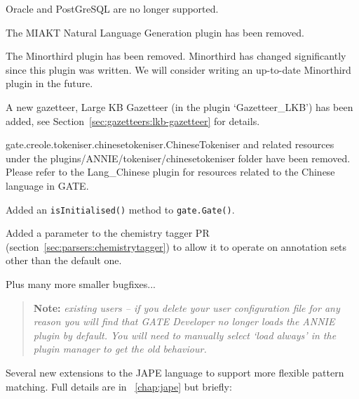Oracle and PostGreSQL are no longer supported.

The MIAKT Natural Language Generation plugin has been removed.

The Minorthird plugin has been removed. Minorthird has changed significantly
since this plugin was written. We will consider writing an up-to-date
Minorthird plugin in the future.

A new gazetteer, Large KB Gazetteer (in the plugin `Gazetteer\_LKB') has been
added, see Section~\ref{sec:gazetteers:lkb-gazetteer} for details.

gate.creole.tokeniser.chinesetokeniser.ChineseTokeniser and related resources 
under the plugins/ANNIE/tokeniser/chinesetokeniser folder have been removed.
Please refer to the Lang\_Chinese plugin for resources related to the Chinese 
language in GATE.

Added an {\tt isInitialised()} method to {\tt gate.Gate()}.

Added a parameter to the chemistry tagger PR
(section~\ref{sec:parsers:chemistrytagger}) to allow it to operate on
annotation sets other than the default one.

Plus many more smaller bugfixes...


\label{sec:changes:5.0b1}

\begin{quote}
\textbf{Note:} {\em existing users -- if you delete your user configuration
file for any reason you will find that GATE Developer no longer loads the ANNIE plugin
by default.  You will need to manually select `load always' in the plugin
manager to get the old behaviour.}
\end{quote}



Several new extensions to the JAPE language to support more flexible pattern
matching.  Full details are in \Chapthing~\ref{chap:jape} but briefly:

